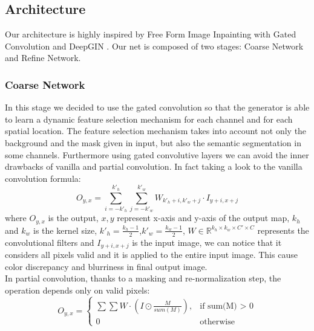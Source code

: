\documentclass[10pt,twocolumn,letterpaper]{article}
\begin{document}
\subsection{Architecture}
Our architecture is highly inspired by Free Form Image Inpainting with Gated Convolution \cite{yu2019free} and DeepGIN \cite{li2020deepgin}.
Our net is composed of two stages: Coarse Network and Refine Network.
\subsubsection{Coarse Network}
In this stage we decided to use the gated convolution so that the generator is able to learn a dynamic feature selection mechanism for each channel and for each spatial location. The feature selection mechanism takes into account not only the background and the mask given in input, but also the semantic segmentation in some channels.
Furthermore using gated convolutive layers we can avoid the inner drawbacks of vanilla and partial convolution. In fact taking a look to the vanilla convolution formula:
\begin{equation}
    O_{y,x} = \sum_{i=-k'_h}^{k'_h}\sum_{j=-k'_w}^{k'_w} W_{k'_h + i, k'_w + j} \cdot I_{y + i, x + j}
\end{equation}
where \(O_{y,x}\) is the output, \(x,y\) represent x-axis and y-axis of the output map, \(k_h\) and \(k_w\) is the kernel size, \(k'_h = \frac{k_h - 1}{2}\),\(k'_w = \frac{k_w - 1}{2}\), \(W \in \mathbb{R}^{k_h \times k_w \times C' \times C}\) represents the convolutional filters and \(I_{y + i, x + j}\) is the input image, we can notice that it considers all pixels valid and it is applied to the entire input image. This cause color discrepancy and blurriness in final output image.
\\
In partial convolution, thanks to a masking and re-normalization step, the operation depends only on valid pixels:
\begin{equation}
    O_{y,x} = \begin{cases}
    \sum \sum W \cdot (I \odot \frac{M}{sum(M)}), & \text{if sum(M) \(>\) 0} \\ 0 & \text{otherwise}
    \end{cases}
\end{equation}
\end{document}
